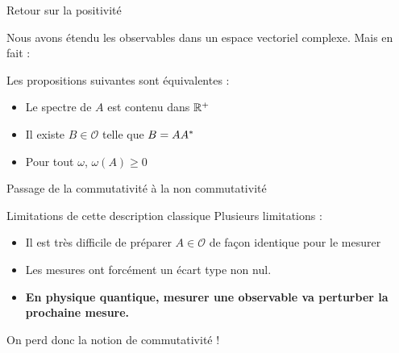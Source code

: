 \documentclass[11pt, xcolor=table]{beamer}
\begin{document}
\begin{frame}{Retour sur la positivité}

    Nous avons étendu les observables dans un espace vectoriel complexe. Mais en fait :
    \begin{myth}
       Les propositions suivantes sont équivalentes :
        \begin{itemize}
            \item Le spectre de $A$ est contenu dans $\mathbb{R}^+$
            \item Il existe $B \in \mathcal{O}$ telle que $B = A A^\ast $
            \item Pour tout $\omega$, $\omega(A) \geq 0 $
        \end{itemize}

    \end{myth}
\end{frame}

\begin{frame}{Passage de la commutativité à la non commutativité}
    \begin{alertblock}{Limitations de cette description classique}
            Plusieurs limitations :
            \begin{itemize}
                \item Il est très difficile de préparer $A \in \mathcal{O}$ de façon identique pour le mesurer
                \item Les mesures ont forcément un écart type non nul.
                \item \textbf{En physique quantique, mesurer une observable va perturber la prochaine mesure.}
            \end{itemize}
            On perd donc la notion de commutativité !
    \end{alertblock}
\end{frame}
\end{document}
